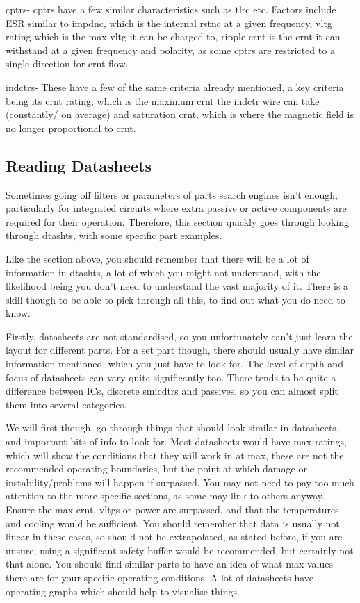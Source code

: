 \documentclass[a4paper,11pt]{report}
\begin{document}
\gls{cptr}s- \gls{cptr}s have a few similar characteristics such as \gls{tlrc} etc. Factors include ESR similar to \gls{impdnc}, which is the internal \gls{rstnc} at a given frequency, \gls{vltg} rating which is the max \gls{vltg} it can be charged to, ripple \gls{crnt} is the \gls{crnt} it can withstand at a given frequency and polarity, as some \gls{cptr}s are restricted to a single direction for \gls{crnt} flow.

\gls{indctr}s- These have a few of the same criteria already mentioned, a key criteria being its \gls{crnt} rating, which is the maximum \gls{crnt} the \gls{indctr} wire can take (constantly/ on average) and saturation \gls{crnt}, which is where the magnetic field is no longer proportional to \gls{crnt}.

\vspace*{1\baselineskip}

\subsection{Reading Datasheets}

Sometimes going off filters or parameters of parts search engines isn't enough, particularly for integrated circuits where extra passive or active components are required for their operation. Therefore, this section quickly goes through looking through \gls{dtasht}s, with some specific part examples.

Like the section above, you should remember that there will be a lot of information in \gls{dtasht}s, a lot of which you might not understand, with the likelihood being you don't need to understand the vast majority of it. There is a skill though to be able to pick through all this, to find out what you do need to know.

Firstly, datasheets are not standardised, so you unfortunately can't just learn the layout for different parts. For a set part though, there should usually have similar information mentioned, which you just have to look for. The level of depth and focus of datasheets can vary quite significantly too. There tends to be quite a difference between ICs, discrete \gls{smicdtr}s and passives, so you can almost split them into several categories.

We will first though, go through things that should look similar in datasheets, and important bits of info to look for. Most datasheets would have max ratings, which will show the conditions that they will work in at max, these are not the recommended operating boundaries, but the point at which damage or instability/problems will happen if surpassed. You may not need to pay too much attention to the more specific sections, as some may link to others anyway. Ensure the max \gls{crnt}, \gls{vltg}s or power are surpassed, and that the temperatures and cooling would be sufficient. You should remember that data is usually not linear in these cases, so should not be extrapolated, as stated before, if you are unsure, using a significant safety buffer would be recommended, but certainly not that alone. You should find similar parts to have an idea of what max values there are for your specific operating conditions. A lot of datasheets have operating graphs which should help to visualise things.
\end{document}
